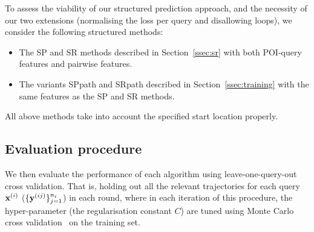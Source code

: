 To assess the viability of our structured prediction approach, and the necessity of our two extensions (normalising the loss per query and disallowing loops), we consider the following structured methods: %
\begin{itemize}[leftmargin=0.125in]\itemmoveup
\parskip -.05em
\item The SP and SR methods described in Section~\ref{ssec:sr} with both POI-query features and pairwise features.


\item The variants {\sc SPpath} and {\sc SRpath} described in Section~\ref{ssec:training} with the same features as the SP and SR methods.
\end{itemize}\itemmoveup
All above methods take into account the specified start location properly.

\secmoveup
\subsection{Evaluation procedure}
\textmoveup

We then evaluate the performance of each algorithm using leave-one-query-out cross validation. 
That is, holding out all the relevant trajectories for each query $\mathbf{x}^{({i})}$ (\ie $\{\mathbf{y}^{({ij})}\}_{j=1}^{n_i}$) in each round,
where in each iteration of this procedure,
the hyper-parameter (\eg the regularisation constant $C$) are tuned using Monte Carlo cross validation~\cite{burman1989comparative} on the training set.

